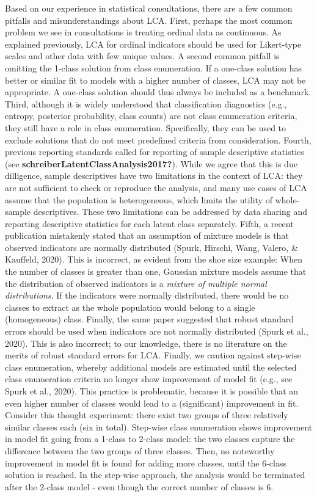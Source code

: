 \documentclass[
  ,man,floatsintext]{apa6}
\begin{document}
Based on our experience in statistical consultations, there are a few
common pitfalls and misunderstandings about LCA. First, perhaps the most
common problem we see in consultations is treating ordinal data as
continuous. As explained previously, LCA for ordinal indicators should
be used for Likert-type scales and other data with few unique values. A
second common pitfall is omitting the 1-class solution from class
enumeration. If a one-class solution has better or similar fit to models
with a higher number of classes, LCA may not be appropriate. A one-class
solution should thus always be included as a benchmark. Third, although
it is widely understood that classification diagnostics (e.g., entropy,
posterior probability, class counts) are not class enumeration criteria,
they still have a role in class enumeration. Specifically, they can be
used to exclude solutions that do not meet predefined criteria from
consideration. Fourth, previous reporting standards called for reporting
of sample descriptive statistics (see \textbf{schreiberLatentClassAnalysis2017?}). While we agree that this is due
dilligence, sample descriptives have two limitations in the context of
LCA: they are not sufficient to check or reproduce the analysis, and
many use cases of LCA assume that the population is heterogeneous, which
limits the utility of whole-sample descriptives. These two limitations
can be addressed by data sharing and reporting descriptive statistics
for each latent class separately. Fifth, a recent publication mistakenly
stated that an assumption of mixture models is that observed indicators
are normally distributed (Spurk, Hirschi, Wang, Valero, \& Kauffeld, 2020). This is incorrect, as
evident from the shoe size example: When the number of classes is
greater than one, Gaussian mixture models assume that the distribution
of observed indicators is a \emph{mixture of multiple normal distributions}.
If the indicators were normally
distributed, there would be no classes to extract as the whole
population would belong to a single (homogeneous) class. Finally, the
same paper suggested that robust standard errors should be used when
indicators are not normally distributed (Spurk et al., 2020). This is
also incorrect; to our knowledge, there is no literature on the merits
of robust standard errors for LCA. Finally, we caution against step-wise
class enumeration, whereby additional models are estimated until the
selected class enumeration criteria no longer show improvement of model
fit (e.g., see Spurk et al., 2020). This practice is problematic,
because it is possible that an even higher number of classes would lead
to a (significant) improvement in fit. Consider this thought experiment:
there exist two groups of three relatively similar classes each (six in
total). Step-wise class enumeration shows improvement in model fit going
from a 1-class to 2-class model: the two classes capture the difference
between the two groups of three classes. Then, no noteworthy improvement
in model fit is found for adding more classes, until the 6-class
solution is reached. In the step-wise approach, the analysis would be
terminated after the 2-class model - even though the correct number of
classes is 6.
\end{document}
